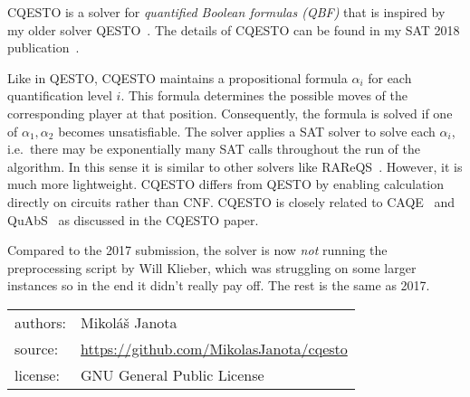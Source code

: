 \documentclass[a4paper,12pt]{article}
\title{\theTitle}
\author{{\miko}\\
IST/INESC-ID,\\
University of Lisbon, Portugal\\
\href{mailto:mikolas.janota@gmail.com}{mikolas.janota@gmail.com}
}
\def\miko{Mikol\'a\v{s} Janota}
\begin{document}
\maketitle

CQESTO is a solver for \emph{quantified Boolean formulas (QBF)} that 
is inspired by my older solver QESTO~\cite{janota-ijcai15}.
The details of CQESTO can be found in my SAT 2018 publication~\cite{janota-sat18}.

Like in QESTO, CQESTO maintains a propositional formula $\alpha_i$
for each quantification level $i$.
This formula determines the possible moves of the corresponding player at that position.
Consequently, the formula is solved if one of $\alpha_1,\alpha_2$ becomes unsatisfiable.
The solver applies a SAT solver to solve each $\alpha_i$,
i.e.\ there may be exponentially many SAT calls throughout the run of the algorithm.
In this sense it is similar to other solvers like RAReQS~\cite{janota-sat11,janota-sat12,janota-ai16}. However, it is much more lightweight. CQESTO differs from QESTO 
by enabling calculation directly on circuits rather than CNF.
%
CQESTO is closely related to CAQE~\cite{RabeFMCAD15} and QuAbS~\cite{TentrupSAT16} as discussed in the CQESTO paper.

Compared to the 2017 submission, the solver is now  \emph{not} running the preprocessing script by Will Klieber,
which was struggling on some larger instances so in the end it didn't really pay off.
The rest is the same as 2017.


\noindent\begin{tabular}{ll}
     authors:& \miko\\
     source:& \url{https://github.com/MikolasJanota/cqesto}\\
     license:& GNU General Public License
\end{tabular}



\end{document}
